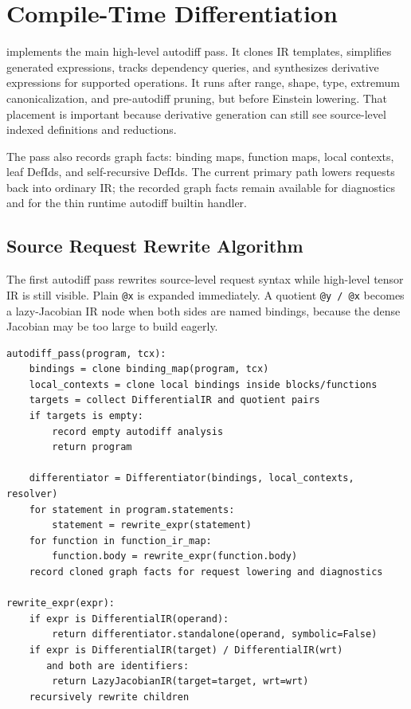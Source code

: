 \section{Compile-Time Differentiation}

 implements the main
high-level autodiff pass. It clones IR templates, simplifies generated
expressions, tracks dependency queries, and synthesizes derivative expressions
for supported operations. It runs after range, shape, type, extremum
canonicalization, and pre-autodiff pruning, but before Einstein lowering. That
placement is important because derivative generation can still see source-level
indexed definitions and reductions.

The pass also records graph facts: binding maps, function maps, local contexts,
leaf DefIds, and self-recursive DefIds. The current primary path lowers
requests back into ordinary IR; the recorded graph facts remain available for
diagnostics and for the thin runtime autodiff builtin handler.

\subsection{Source Request Rewrite Algorithm}

The first autodiff pass rewrites source-level request syntax while high-level
tensor IR is still visible. Plain \texttt{@x} is expanded immediately. A
quotient \texttt{@y / @x} becomes a lazy-Jacobian IR node when both sides are
named bindings, because the dense Jacobian may be too large to build eagerly.

\begin{lstlisting}[style=pythoncode,caption={Compile-time autodiff request rewriting.}]
autodiff_pass(program, tcx):
    bindings = clone binding_map(program, tcx)
    local_contexts = clone local bindings inside blocks/functions
    targets = collect DifferentialIR and quotient pairs
    if targets is empty:
        record empty autodiff analysis
        return program

    differentiator = Differentiator(bindings, local_contexts, resolver)
    for statement in program.statements:
        statement = rewrite_expr(statement)
    for function in function_ir_map:
        function.body = rewrite_expr(function.body)
    record cloned graph facts for request lowering and diagnostics

rewrite_expr(expr):
    if expr is DifferentialIR(operand):
        return differentiator.standalone(operand, symbolic=False)
    if expr is DifferentialIR(target) / DifferentialIR(wrt)
       and both are identifiers:
        return LazyJacobianIR(target=target, wrt=wrt)
    recursively rewrite children
\end{lstlisting}

